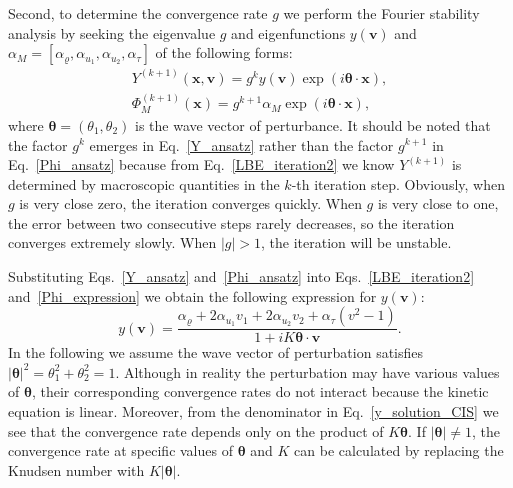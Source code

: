 Second, to determine the convergence rate ${g}$ we perform the Fourier stability analysis by seeking the eigenvalue ${g}$ and eigenfunctions $y(\bm{v})$ and $\alpha_M=[\alpha_\varrho,\alpha_{u_1}, \alpha_{u_2}, \alpha_\tau]$  of the following forms:
\begin{eqnarray}
Y^{(k+1)}(\bm{x},\bm{v})={g}^{k}y(\bm{v})\exp(i\bm{\theta}\cdot{\bm{x}}),\label{Y_ansatz} \\
\Phi^{(k+1)}_{M}(\bm{x})={g}^{k+1}\alpha_M\exp(i\bm{\theta}\cdot{\bm{x}}), \label{Phi_ansatz}
\end{eqnarray}
where  $\bm{\theta}=(\theta_1,\theta_2)$ is the wave vector of perturbance. It should be noted that the factor ${g}^k$ emerges in Eq.~\eqref{Y_ansatz} rather than the factor ${g}^{k+1}$ in Eq.~\eqref{Phi_ansatz} because from Eq.~\eqref{LBE_iteration2} we know $Y^{(k+1)}$ is
determined by macroscopic quantities in the $k$-th iteration step. Obviously, when ${g}$ is very close zero, the iteration converges quickly. When ${g}$ is very close to one, the error between two consecutive steps rarely decreases, so the iteration converges extremely slowly. When $|{g}|>1$, the iteration will be unstable. 


Substituting Eqs.~\eqref{Y_ansatz} and~\eqref{Phi_ansatz} into Eqs.~\eqref{LBE_iteration2} and~\eqref{Phi_expression} we obtain the following expression for $y(\bm{v})$:
\begin{equation}\label{y_solution_CIS}
y(\bm{v})=\frac{\alpha_\varrho+2\alpha_{u_1}v_1+2\alpha_{u_2}v_2+\alpha_\tau(v^2-1)}{ 1+iK\bm{\theta}\cdot\bm{v} }.
\end{equation}
In the following we assume the wave vector of perturbation satisfies $|\bm{\theta}|^2=\theta_1^2+\theta_2^2=1$. Although in reality the perturbation may have various values of $\bm{\theta}$, their corresponding convergence rates do not interact because the kinetic equation is linear. Moreover, from the denominator in Eq.~\eqref{y_solution_CIS} we see that the convergence rate depends only on the product of $K\bm{\theta}$. If $|\bm{\theta}|\neq1$, the convergence rate at specific values of $\bm{\theta}$ and $K$ can be calculated by replacing the Knudsen number with $K|\bm{\theta}|$. 


